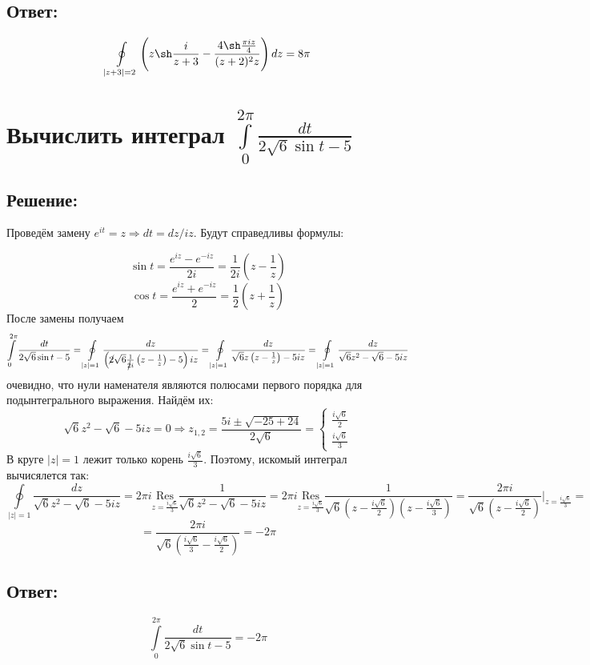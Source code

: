 \documentclass{article}
\begin{document}
	\subsection{Ответ:}
	\[\oint\limits_{|z+3|=2}\left(z \sh \frac{i}{z+3} - \frac{4 \sh \frac{\pi i z}{4}}{(z+2)^2z}\right) dz = 8\pi\]
	
	\section{Вычислить интеграл $\int\limits_{0}^{2\pi} \frac{dt}{2\sqrt{6}\sin t - 5}$}
	\subsection{Решение:}
	Проведём замену $e^{it} = z\Rightarrow dt = dz/iz$. Будут справедливы формулы:
	
	\[\sin t = \frac{e^{iz} - e^{-iz}}{2i} = \frac{1}{2i}\left(z - \frac{1}{z}\right)\]
	\[\cos t = \frac{e^{iz} + e^{-iz}}{2} = \frac{1}{2}\left(z + \frac{1}{z}\right)\]
	После замены получаем
	\[\int\limits_{0}^{2\pi} \frac{dt}{2\sqrt{6}\sin t - 5} = \oint \limits_{|z|=1} \frac{dz}{\left(\cancel{2} \sqrt{6} \frac{1}{\cancel{2}i}\left(z - \frac{1}{z}\right) -5\right)iz} = \oint \limits_{|z|=1} \frac{dz}{\sqrt{6}z \left(z - \frac{1}{z}\right) -5iz} = \oint \limits_{|z|=1} \frac{dz}{\sqrt{6}z^2 - \sqrt{6} -5iz}\]
	очевидно, что нули наменателя являются полюсами первого порядка для подынтегрального выражения. Найдём их:
	\[\sqrt{6}z^2 - \sqrt{6} -5iz =0 \Rightarrow z_{1,2} = \frac{5i \pm \sqrt{-25 + 24}}{2\sqrt{6}} = \begin{cases}
		\frac{i\sqrt{6}}{2} \\
		\frac{i\sqrt{6}}{3}
	\end{cases}\]
	В круге $|z|=1$ лежит только корень $\frac{i\sqrt{6}}{3}$. Поэтому, искомый интеграл вычисялется так:
	\[\oint \limits_{|z|=1} \frac{dz}{\sqrt{6}z^2 - \sqrt{6} -5iz} = 2\pi i \underset{z=\frac{i\sqrt{6}}{3}}{\text{Res}} \frac{1}{\sqrt{6}z^2 - \sqrt{6} -5iz} = 2\pi i \underset{z=\frac{i\sqrt{6}}{3}}{\text{Res}} \frac{1}{\sqrt{6}\left(z - \frac{i\sqrt{6}}{2}\right)\left(z - \frac{i\sqrt{6}}{3}\right)} = \frac{2\pi i}{\sqrt{6}\left(z - \frac{i\sqrt{6}}{2}\right)}\Big|_{z = \frac{i\sqrt{6}}{3}}  =\]
	\[= \frac{2 \pi i }{\sqrt{6}\left(\frac{i\sqrt{6}}{3} - \frac{i\sqrt{6}}{2}\right)} = -2\pi\]
	\subsection{Ответ:}
	\[\int\limits_{0}^{2\pi} \frac{dt}{2\sqrt{6}\sin t - 5} = -2\pi\]
	
\end{document}
